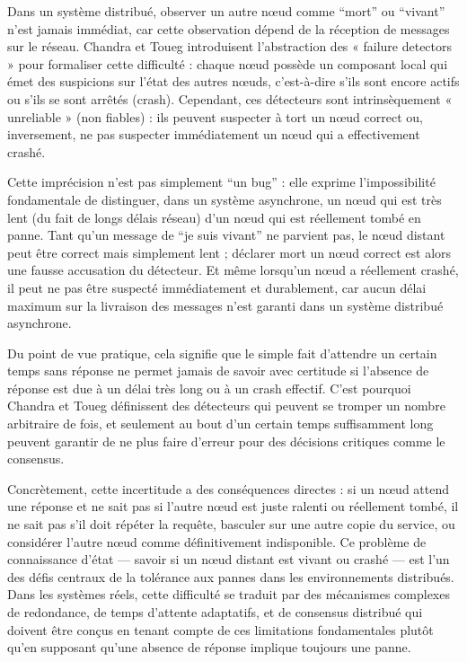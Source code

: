 \documentclass[12pt,a4paper]{article}
\begin{document}
Dans un système distribué, observer un autre nœud comme “mort” ou “vivant” n’est jamais immédiat, car cette observation dépend de la réception de messages sur le réseau. Chandra et Toueg introduisent l’abstraction des « failure detectors » pour formaliser cette difficulté : chaque nœud possède un composant local qui émet des suspicions sur l’état des autres nœuds, c’est-à-dire s’ils sont encore actifs ou s’ils se sont arrêtés (crash). Cependant, ces détecteurs sont intrinsèquement « unreliable » (non fiables) : ils peuvent suspecter à tort un nœud correct ou, inversement, ne pas suspecter immédiatement un nœud qui a effectivement crashé.

\vspace{0.25cm}

Cette imprécision n’est pas simplement “un bug” : elle exprime l’impossibilité fondamentale de distinguer, dans un système asynchrone, un nœud qui est très lent (du fait de longs délais réseau) d’un nœud qui est réellement tombé en panne. Tant qu’un message de “je suis vivant” ne parvient pas, le nœud distant peut être correct mais simplement lent ; déclarer mort un nœud correct est alors une fausse accusation du détecteur. Et même lorsqu’un nœud a réellement crashé, il peut ne pas être suspecté immédiatement et durablement, car aucun délai maximum sur la livraison des messages n’est garanti dans un système distribué asynchrone.

\vspace{0.25cm}

Du point de vue pratique, cela signifie que le simple fait d’attendre un certain temps sans réponse ne permet jamais de savoir avec certitude si l’absence de réponse est due à un délai très long ou à un crash effectif. C’est pourquoi Chandra et Toueg définissent des détecteurs qui peuvent se tromper un nombre arbitraire de fois, et seulement au bout d’un certain temps suffisamment long peuvent garantir de ne plus faire d’erreur pour des décisions critiques comme le consensus.

\vspace{0.25cm}

Concrètement, cette incertitude a des conséquences directes : si un nœud attend une réponse et ne sait pas si l’autre nœud est juste ralenti ou réellement tombé, il ne sait pas s’il doit répéter la requête, basculer sur une autre copie du service, ou considérer l’autre nœud comme définitivement indisponible. Ce problème de connaissance d’état — savoir si un nœud distant est vivant ou crashé — est l’un des défis centraux de la tolérance aux pannes dans les environnements distribués. Dans les systèmes réels, cette difficulté se traduit par des mécanismes complexes de redondance, de temps d’attente adaptatifs, et de consensus distribué qui doivent être conçus en tenant compte de ces limitations fondamentales plutôt qu’en supposant qu’une absence de réponse implique toujours une panne.
\end{document}
